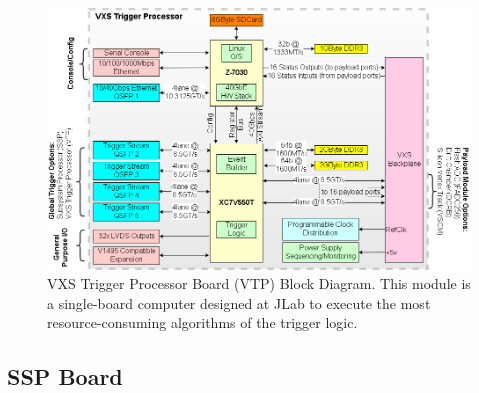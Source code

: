 \begin{figure}[hbt]
	\centering
	\includegraphics[width=1.0\columnwidth,keepaspectratio]{img/vtp_block_daq.png}
	\caption{VXS Trigger Processor Board (VTP) Block Diagram. This module is a single-board computer
          designed at JLab to execute the most resource-consuming algorithms of the trigger logic.}
	\label{fig:vtp_block_daq}
\end{figure}


\subsection{SSP Board}
\label{sec:ssp_board}

